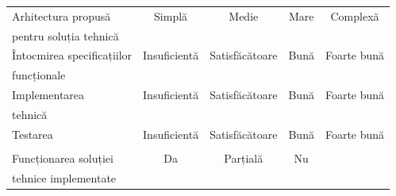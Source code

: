 \begin{flushleft}
\begin{tabular}{l l c c c c }
	\hline
	\midrule
	\multicolumn{2}{l}{Arhitectura propusă } & 
	Simplă & Medie & Mare & Complexă \\
	\multicolumn{2}{l}{pentru soluția tehnică}	&
	\unCheckedBox\hspace{5pt} & \unCheckedBox\hspace{5pt}  &
	\unCheckedBox\hspace{5pt}  &
	\unCheckedBox\hspace{5pt}  \\
	
	\hline
	\midrule
	\multicolumn{2}{l}{Întocmirea specificațiilor } & 
	Insuficientă & Satisfăcătoare & Bună & Foarte bună \\
	\multicolumn{2}{l}{funcționale}	&
	\unCheckedBox\hspace{5pt} & \unCheckedBox\hspace{5pt}  &
	\unCheckedBox\hspace{5pt}  &
	\unCheckedBox\hspace{5pt}  \\
	
	\hline
	\midrule
	\multicolumn{2}{l}{Implementarea } & 
	Insuficientă & Satisfăcătoare & Bună & Foarte bună \\
	\multicolumn{2}{l}{tehnică}	&
	\unCheckedBox\hspace{5pt} & \unCheckedBox\hspace{5pt}  &
	\unCheckedBox\hspace{5pt}  &
	\unCheckedBox\hspace{5pt}  \\
	
	\hline
	\midrule
	\multicolumn{2}{l}{Testarea} & 
	Insuficientă & Satisfăcătoare & Bună & Foarte bună \\
	\multicolumn{2}{l}{}	&
	\unCheckedBox\hspace{5pt} & \unCheckedBox\hspace{5pt}  &
	\unCheckedBox\hspace{5pt}  &
	\unCheckedBox\hspace{5pt}  \\

	\hline
	\midrule
	\multicolumn{2}{l}{Funcționarea soluției  } & 
	Da & Parțială & Nu &  \\
	\multicolumn{2}{l}{tehnice implementate}	&
	\unCheckedBox\hspace{5pt} & \unCheckedBox\hspace{5pt}  &
	\unCheckedBox\hspace{5pt}  &  \\
	

\end{tabular}
\end{flushleft}
